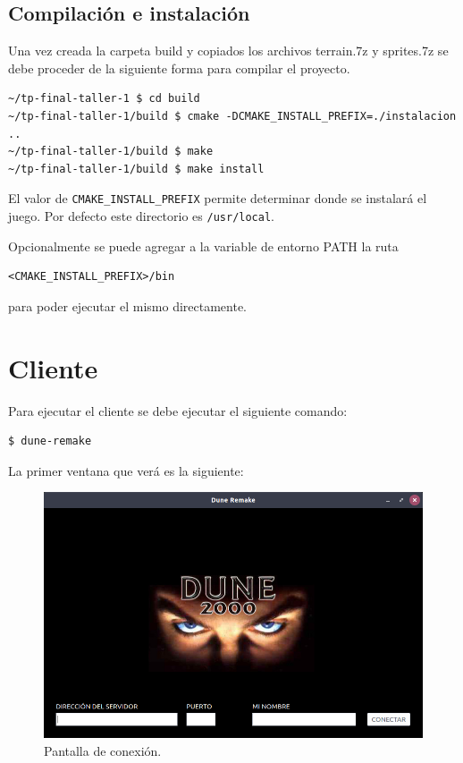 \documentclass[titlepage,a4paper,12pt]{article}
\begin{document}
\subsection{Compilación e instalación}
Una vez creada la carpeta build y copiados los archivos terrain.7z y sprites.7z se debe proceder de la siguiente forma para compilar el proyecto.

\begin{verbatim}
~/tp-final-taller-1 $ cd build
~/tp-final-taller-1/build $ cmake -DCMAKE_INSTALL_PREFIX=./instalacion ..
~/tp-final-taller-1/build $ make
~/tp-final-taller-1/build $ make install
\end{verbatim}

El valor de \texttt{CMAKE\_INSTALL\_PREFIX} permite determinar donde se instalará el juego. Por defecto este directorio es \texttt{/usr/local}.

Opcionalmente se puede agregar a la variable de entorno PATH la ruta 

\begin{verbatim} 
<CMAKE_INSTALL_PREFIX>/bin 
\end{verbatim}

para poder ejecutar el mismo directamente.

\newpage
\section{Cliente}
Para ejecutar el cliente se debe ejecutar el siguiente comando:
\begin{verbatim}
$ dune-remake
\end{verbatim}

La primer ventana que verá es la siguiente:
\begin{figure}[H]
	\centering
	\includegraphics[width=12cm]{../imagenes/lanzador-cliente-conexion.png}
	\caption{\label{fig:lanzador-cliente-conexion} Pantalla de conexión.}
\end{figure}
\end{document}
